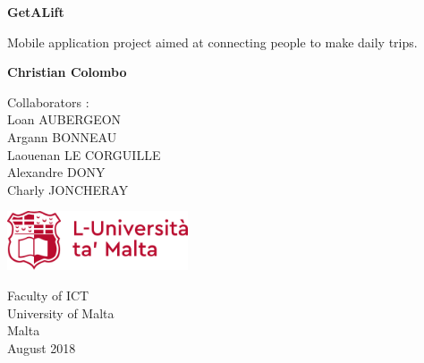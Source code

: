 \begin{titlepage}
    \begin{center}
        \vspace*{1cm}
        
        \Huge
        \textbf{GetALift}
        
        \vspace{0.5cm}
        \LARGE
         Mobile application project aimed at connecting people to make daily trips.
        
        \vspace{1.5cm}
        
        \textbf{Christian Colombo}
        
        \vfill
        
        
        Collaborators :\\
        \normalsize
        Loan AUBERGEON\\
        Argann BONNEAU\\
        Laouenan LE CORGUILLE\\
        Alexandre DONY\\
        Charly JONCHERAY\\
        
        \vspace{2cm}
        
        \includegraphics[width=0.4\textwidth]{diagrams/university_of_malta.png}
        
        \Large
        Faculty of ICT\\
        University of Malta\\
        Malta\\
        August 2018
        
    \end{center}
\end{titlepage}